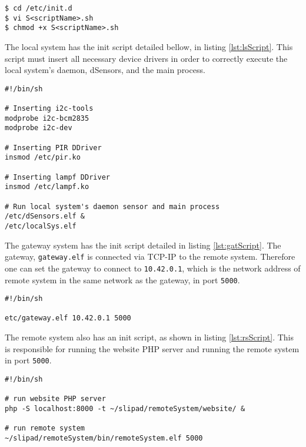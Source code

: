 \begin{lstlisting}[caption={Procedure for creating an init script, named Sscript\_name}, label={lst:initScript}]
$ cd /etc/init.d
$ vi S<scriptName>.sh
$ chmod +x S<scriptName>.sh
\end{lstlisting}

The local system has the init script detailed bellow, in listing \ref{lst:lsScript}. This script must insert all necessary device drivers in order to correctly execute the local system's daemon, dSensors, and the main process. 

\begin{lstlisting}[caption={Init script for local system.}, label={lst:lsScript}]
#!/bin/sh

# Inserting i2c-tools
modprobe i2c-bcm2835
modprobe i2c-dev

# Inserting PIR DDriver
insmod /etc/pir.ko

# Inserting lampf DDriver
insmod /etc/lampf.ko

# Run local system's daemon sensor and main process
/etc/dSensors.elf &
/etc/localSys.elf
\end{lstlisting}

The gateway system has the init script detailed in listing \ref{lst:gatScript}. The gateway, \verb|gateway.elf| is connected via TCP-IP to the remote system. Therefore one can set the gateway to connect to \verb|10.42.0.1|, which is the network address of remote system in the same network as the gateway, in port \verb|5000|.

\begin{lstlisting}[caption={Init script for Gateway system.}, label={lst:gatScript}]
#!/bin/sh

etc/gateway.elf 10.42.0.1 5000
\end{lstlisting}

The remote system also has an init script, as shown in listing \ref{lst:rsScript}. This is responsible for running the website PHP server \cite{phpserver} and running the remote system in port \verb|5000|.

\begin{lstlisting}[caption={Init script for remote system.}, label={lst:rsScript}]
#!/bin/sh

# run website PHP server
php -S localhost:8000 -t ~/slipad/remoteSystem/website/ &

# run remote system
~/slipad/remoteSystem/bin/remoteSystem.elf 5000

\end{lstlisting}